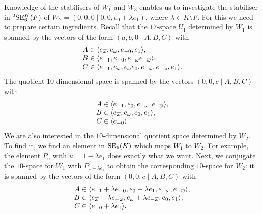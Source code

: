 Knowledge of the stabilisers of $W_1$ and $W_3$ enables us to 
investigate the stabiliser in ${}^2\mathrm{SE}_6^K(F)$ of 
\mbox{$W_2 = (0,0,0 \mid 0,0,e_0 + \lambda e_1)$}, where $\lambda \in K \setminus F$. 
For this we need to prepare certain ingredients. 
Recall that the $17$-space $U_1$ determined by $W_1$ is spanned by the vectors of the form
$(a,b,0\mid A,B,C)$ with 
\begin{equation}
	\begin{array}{r@{\;}c@{\;}l}
		A & \in & \langle e_{\bar{\omega}}, e_{\omega}, e_{-0}, e_{1} \rangle, \\
		B & \in & \langle e_{-1}, e_{-0}, e_{-\omega} e_{-\bar{\omega}} \rangle, \\
		C & \in & \langle e_{-1}, e_{\bar{\omega}}, e_{\omega} e_0, 
					e_{-\omega}, e_{-\bar{\omega}}, e_{1} \rangle. 
	\end{array}
\end{equation}
The quotient $10$-dimensional space is spanned by the vectors $(0,0,c\mid A,B,C)$ with 
\begin{equation}
	\begin{array}{r@{\;}c@{\;}l}
		A & \in & \langle e_{-1}, e_0, e_{-\omega}, e_{-\bar{\omega}} \rangle, \\
		B & \in & \langle e_{\bar{\omega}}, e_{\omega}, e_0, e_1 \rangle, \\
		C & \in & \langle e_{-0} \rangle.
	\end{array}
\end{equation}
We are also interested in the $10$-dimensional quotient space determined by $W_2$. To find it, we 
find an element in $\mathrm{SE}_6(K)$ which maps $W_1$ to $W_2$. For example, the element
$P_u$ with $u = 1 - \lambda e_1$ does exactly what we want. Next, we conjugate the $10$-space
for $W_1$ with $P_{1-\lambda e_1}$ to obtain the corresponding $10$-space for $W_2$: it is spanned
by the vectors of the form $(0,0,c \mid A,B,C)$ with
\begin{equation}
	\begin{array}{r@{\;}c@{\;}l}
		A & \in & \langle e_{-1}+\lambda e_{-0}, e_0 - \lambda e_1, e_{-\omega}, e_{-\bar{\omega}}
					\rangle, \\
					
		B & \in & \langle e_{\bar{\omega}}-\lambda e_{-\omega}, e_{\omega} + \lambda e_{-\bar{\omega}},
					e_0, e_1 \rangle, \\
					
		C & \in & \langle e_{-0} + \lambda e_1 \rangle.
	\end{array}
\end{equation}
